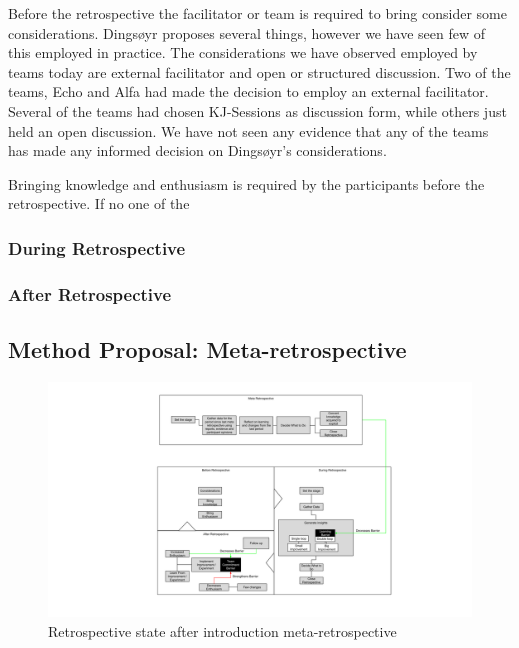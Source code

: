 Before the retrospective the facilitator or team is required to bring consider some considerations. Dingsøyr \cite{Dingsoyr2004} proposes several things, however we have seen few of this employed in practice. The considerations we have observed employed by teams today are external facilitator and open or structured discussion. Two of the teams, Echo and Alfa had made the decision to employ an external facilitator. Several of the teams had chosen KJ-Sessions as discussion form, while others just held an open discussion. We have not seen any evidence that any of the teams has made any informed decision on Dingsøyr's considerations. 

Bringing knowledge and enthusiasm is required by the participants before the retrospective. If no one of the 

\subsubsection{During Retrospective}

\subsubsection{After Retrospective}



\subsection{Method Proposal: Meta-retrospective}

\begin{figure}
	\centering
	\includegraphics[width=\textwidth, keepaspectratio]{figures/meta-retro.png}
	\caption{Retrospective state after introduction meta-retrospective}
	\label{figure:retro-meta-state}
\end{figure}

